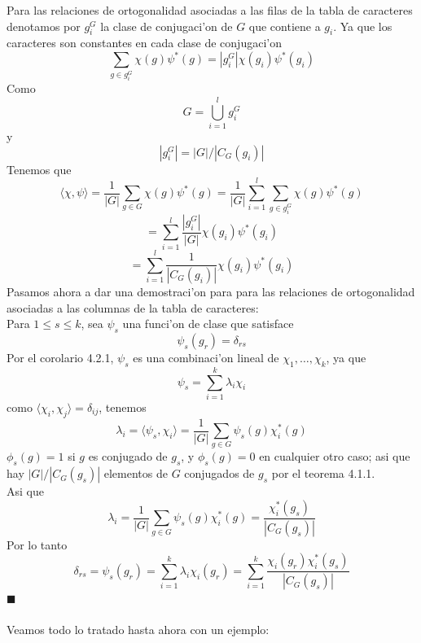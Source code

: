 \documentclass[a4paper,openright,12pt]{book}
\numberwithin{equation}{section} %
\newenvironment{proof}{\noindent{\it Demostracion:}}{\hfill$\blacksquare$} %
\begin{document}
\begin{proof}
Para las relaciones de ortogonalidad asociadas a las filas de la tabla de caracteres denotamos por $g_{i}^{G}$ la clase de conjugaci'on de $G$ que contiene a $g_{i}$. Ya que los caracteres son constantes en cada clase de conjugaci'on
\[
\sum_{g \in g_{i}^{G}}\chi(g)\psi^{*}(g)=|g_{i}^{G}|\chi(g_{i})\psi^{*}(g_{i})
\]
Como
\[
G=\bigcup_{i=1}^{l} g_{i}^{G}
\]
y
\[
|g_{i}^{G}|=|G|/|C_{G}(g_{i})|
\]
Tenemos que
\[
\langle \chi, \psi \rangle = \frac{1}{|G|} \sum_{g \in G}\chi(g)\psi^{*}(g)=\frac{1}{|G|} \sum_{i=1}^{l} \sum_{g \in g_{i}^{G}} \chi(g)\psi^{*}(g)
\]
\[
=\sum_{i=1}^{l}\frac{|g_{i}^{G}|}{|G|}\chi (g_{i})\psi^{*}(g_{i})
\]
\[
=\sum_{i=1}^{l}\frac{1}{|C_{G}(g_{i})|}\chi(g_{i})\psi^{*}(g_{i})
\]
Pasamos ahora a dar una demostraci'on para para las relaciones de ortogonalidad asociadas a las columnas de la tabla de caracteres:\\
Para $1 \leq s \leq k$, sea $\psi_{s}$ una funci'on de clase que satisface 
\[
\psi_{s}(g_{r})=\delta_{rs}
\]
Por el corolario 4.2.1, $\psi_{s}$ es una combinaci'on lineal de $\chi_{1}, \ldots ,\chi_{k}$, ya que
\[
\psi_{s}=\sum_{i=1}^{k}\lambda_{i}\chi_{i}
\]
como $\langle \chi_{i} ,\chi_{j} \rangle = \delta_{ij}$, tenemos
\[
\lambda_{i}=\langle \psi_{s}, \chi_{i} \rangle = \frac{1}{|G|}\sum_{g \in G}\psi_{s}(g)\chi_{i}^{*}(g)
\]
$\phi_{s}(g)=1$ si $g$ es conjugado de $g_{s}$, y $\phi_{s}(g)=0$ en cualquier otro caso; asi que hay $|G|/|C_{G}(g_{s})|$ elementos de $G$ conjugados de $g_{s}$ por el teorema 4.1.1.\\
Asi que
\[
\lambda_{i}=\frac{1}{|G|}\sum_{g \in G}\psi_{s}(g)\chi_{i}^{*}(g)=\frac{\chi_{i}^{*}(g_{s})}{|C_{G}(g_{s})|}
\]
Por lo tanto
\[
\delta_{rs}=\psi_{s}(g_{r})=\sum_{i=1}^{k}\lambda_{i}\chi_{i}(g_{r})=\sum_{i=1}^{k}\frac{\chi_{i}(g_{r})\chi_{i}^{*}(g_{s})}{|C_{G}(g_{s})|}
\]
\end{proof}\\
\\
Veamos todo lo tratado hasta ahora con un ejemplo:
\end{document}
